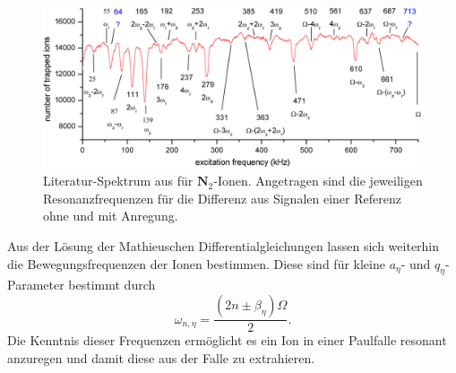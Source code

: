 \documentclass[numbers=noenddot,a4paper,notitlepage,twoside,BCOR15mm]{scrartcl}
\newcommand{\fett}[1]{\textbf{#1}}
\begin{document}
		\begin{figure}[!h]
			\centering
			\includegraphics[width=\textwidth]{pics/referenz.png}
			\caption{Literatur-Spektrum aus \cite{Paul-FalleREF} für $\fett{N}_2$-Ionen. Angetragen sind die jeweiligen Resonanzfrequenzen für die Differenz aus Signalen einer Referenz ohne und mit Anregung.}\label{img:referenz}
		\end{figure}
	Aus der Lösung der Mathieuschen Differentialgleichungen lassen sich weiterhin die Bewegungsfrequenzen der Ionen bestimmen. Diese sind für kleine $a_\eta$- und $q_\eta$-Parameter bestimmt durch
	\begin{equation}
		\omega_{n,\eta} = \frac{(2n\pm \beta_\eta)\Omega}{2}.
	\end{equation}
	Die Kenntnis dieser Frequenzen ermöglicht es ein Ion in einer Paulfalle resonant anzuregen und damit diese aus der Falle zu extrahieren.

	\newpage
\end{document}
